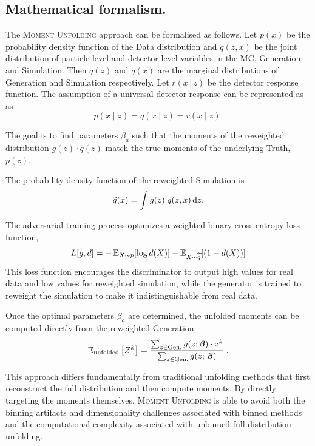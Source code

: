     \subsection{Mathematical formalism.}
    
        The \textsc{Moment Unfolding} approach can be formalised as follows.
        Let $p(x)$ be the probability density function of the Data distribution and $q(z,x)$ be the joint distribution of particle level and detector level variables in the MC, Generation and Simulation.
        Then $q(z)$ and $q(x)$ are the marginal distributions of Generation and Simulation respectively.
        Let $r(x\,|\,z)$ be the detector response function.
        The assumption of a universal detector response can be represented as as
        \[
            p(x\mid z) = q(x\mid z) = r(x\mid z).
        \]
        
        The goal is to find parameters $\beta_a$ such that the moments of the reweighted distribution $g(z) \cdot q(z)$ match the true moments of the underlying Truth, \(p(z)\).

        The probability density function of the reweighted Simulation is
        \[
            \widetilde{q}(x) = \int g(z)\; q(z, x) \, \dd z.
        \]
        
        The adversarial training process optimizes a weighted binary cross entropy loss function,
        \[
            L[g,d] = -\operatorname{\mathbb{E}}_{X \sim p}[\log d(X)] - \operatorname{\mathbb{E}}_{X \sim\widetilde{q}}[(1-d(X))]
        \]
        This loss function encourages the discriminator to output high values for real data and low values for reweighted simulation, while the generator is trained to reweight the simulation to make it indistinguishable from real data.

        Once the optimal parameters $\beta_a$ are determined, the unfolded moments can be computed directly from the reweighted Generation
        \[
            \operatorname{\mathbb{E}}_{\text{unfolded}}\qty[Z^k] = \frac{\sum_{z \in \text{Gen.}} g(z;\vb*\beta) \cdot z^k}{\sum_{z \in \text{Gen.}} g(z;\,\vb*\beta)}\;.
        \]
        
        This approach differs fundamentally from traditional unfolding methods that first reconstruct the full distribution and then compute moments.
        By directly targeting the moments themselves, \textsc{Moment Unfolding} is able to avoid both the binning artifacts and dimensionality challenges associated with binned methods and the computational complexity associated with unbinned full distribution unfolding.
